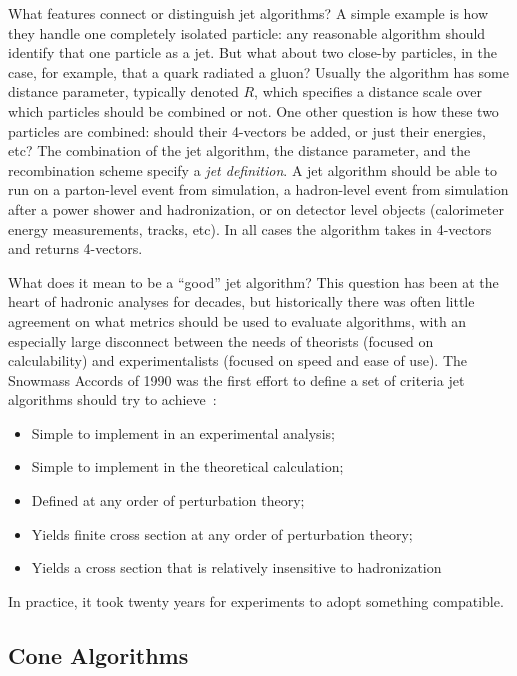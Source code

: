 What features connect or distinguish jet algorithms? A simple example is how they handle one completely isolated particle: any reasonable algorithm should identify that one particle as a jet. But what about two close-by particles, in the case, for example, that a quark radiated a gluon? Usually the algorithm has some distance parameter, typically denoted $R$, which specifies a distance scale over which particles should be combined or not. One other question is how these two particles are combined: should their 4-vectors be added, or just their energies, etc? The combination of the jet algorithm, the distance parameter, and the recombination scheme specify a \textit{jet definition}\cite{Jetography}. A jet algorithm should be able to run on a parton-level event from simulation, a hadron-level event from simulation after a power shower and hadronization, or on detector level objects (calorimeter energy measurements, tracks, etc). In all cases the algorithm takes in 4-vectors and returns 4-vectors.

What does it mean to be a ``good'' jet algorithm? This question has been at the heart of hadronic analyses for decades, but historically there was often little agreement on what metrics should be used to evaluate algorithms, with an especially large disconnect between the needs of theorists (focused on calculability) and experimentalists (focused on speed and ease of use). The Snowmass Accords of 1990 was the first effort to define a set of criteria jet algorithms should try to achieve~\cite{Huth}:
%
\begin{itemize}
\item Simple to implement in an experimental analysis;
\item Simple to implement in the theoretical calculation;
\item Defined at any order of perturbation theory;
\item Yields finite cross section at any order of perturbation theory;
\item Yields a cross section that is relatively insensitive to hadronization
\end{itemize}
%
In practice, it took twenty years for experiments to adopt something compatible.

\subsection{Cone Algorithms} 

